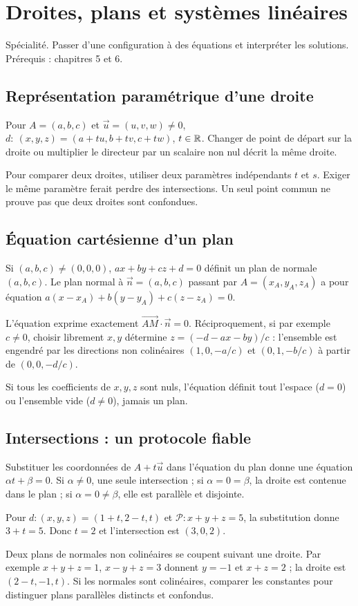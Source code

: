 \documentclass[../cours_tle.tex]{subfiles}
\begin{document}
\setcounter{chapter}{6}
\chapter{Droites, plans et systèmes linéaires}
\label{ch:7}
\begin{objectif}
Spécialité. Passer d'une configuration à des équations et interpréter les solutions. Prérequis : chapitres 5 et 6.
\end{objectif}
\section{Représentation paramétrique d'une droite}
Pour $A=(a,b,c)$ et $\vec u=(u,v,w)\ne0$,
$d:\ (x,y,z)=(a+tu,b+tv,c+tw)$, $t\in\mathbb{R}$.
Changer de point de départ sur la droite ou multiplier le directeur par un scalaire non nul décrit la même droite.
\begin{attention}
Pour comparer deux droites, utiliser deux paramètres indépendants $t$ et $s$. Exiger le même paramètre ferait perdre des intersections. Un seul point commun ne prouve pas que deux droites sont confondues.
\end{attention}
\section{Équation cartésienne d'un plan}
\begin{theoreme}
Si $(a,b,c)\ne(0,0,0)$, $ax+by+cz+d=0$ définit un plan de normale $(a,b,c)$.
Le plan normal à $\vec n=(a,b,c)$ passant par $A=(x_A,y_A,z_A)$ a pour équation
$a(x-x_A)+b(y-y_A)+c(z-z_A)=0$.
\end{theoreme}
\begin{demonstration}
L'équation exprime exactement $\overrightarrow{AM}\cdot\vec n=0$.
Réciproquement, si par exemple $c\ne0$, choisir librement $x,y$ détermine
$z=(-d-ax-by)/c$ : l'ensemble est engendré par les directions non colinéaires $(1,0,-a/c)$ et $(0,1,-b/c)$ à partir de $(0,0,-d/c)$.
\end{demonstration}
Si tous les coefficients de $x,y,z$ sont nuls, l'équation définit tout l'espace ($d=0$) ou l'ensemble vide ($d\ne0$), jamais un plan.
\section{Intersections : un protocole fiable}
Substituer les coordonnées de $A+t\vec u$ dans l'équation du plan donne une équation $\alpha t+\beta=0$.
Si $\alpha\ne0$, une seule intersection ; si $\alpha=0=\beta$, la droite est contenue dans le plan ; si $\alpha=0\ne\beta$, elle est parallèle et disjointe.
\begin{exemple}
Pour $d:(x,y,z)=(1+t,2-t,t)$ et $\mathcal P:x+y+z=5$, la substitution donne $3+t=5$. Donc $t=2$ et l'intersection est $(3,0,2)$.
\end{exemple}
Deux plans de normales non colinéaires se coupent suivant une droite. Par exemple
$x+y+z=1$, $x-y+z=3$ donnent $y=-1$ et $x+z=2$ ; la droite est $(2-t,-1,t)$.
Si les normales sont colinéaires, comparer les constantes pour distinguer plans parallèles distincts et confondus.
\end{document}
